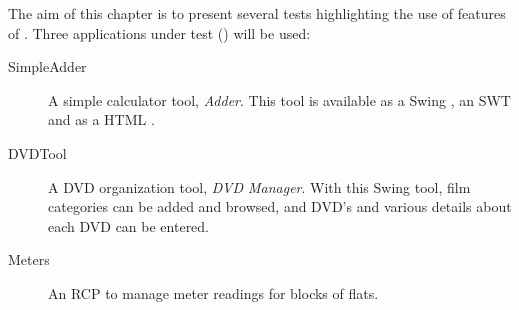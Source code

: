 
The aim of this chapter is to present several tests highlighting the use of  features of \jb{}. Three applications under test (\gdauts) will be used:


\begin{description}
\item[SimpleAdder]{ A simple calculator tool, \emph{Adder}. This tool is available as a Swing \gdaut{}, an SWT \gdaut{} and as a HTML \gdaut{}. }
\item [DVDTool]{A DVD organization tool, \emph{DVD Manager}. With this Swing tool, film categories can be added and browsed, and DVD's and various details about each DVD can be entered.}  
\item [Meters]{An RCP \gdaut{} to manage meter readings for blocks of flats.}
\end{description}



